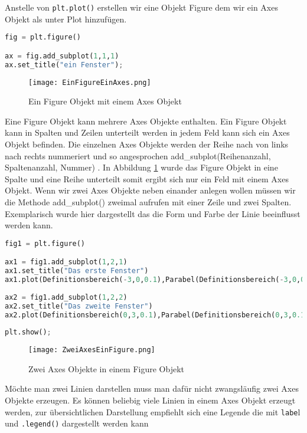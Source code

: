 Anstelle von \texttt{plt.plot()} erstellen wir eine Objekt Figure dem wir ein Axes Objekt als unter Plot hinzufügen.

\begin{lstlisting}[caption= Figure Objekt, label=lst:FigureObjekt,language=Python]
fig = plt.figure()

ax = fig.add_subplot(1,1,1)
ax.set_title("ein Fenster");
\end{lstlisting}

\begin{figure}[!htb]
\centering
\texttt{[image: EinFigureEinAxes.png]}
\caption{Ein Figure Objekt mit einem Axes Objekt}
\label{img:EinFigureEinAxes}
\end{figure}

Eine Figure Objekt kann mehrere Axes Objekte enthalten. Ein Figure Objekt kann in Spalten und Zeilen unterteilt werden in jedem Feld kann sich ein Axes Objekt befinden. Die einzelnen Axes Objekte werden der Reihe nach von links nach rechts nummeriert und so angesprochen add\_subplot(Reihenanzahl, Spaltenanzahl, Nummer) .  In Abbildung \ref{img:EinFigureEinAxes} wurde das Figure Objekt in eine Spalte und eine Reihe unterteilt somit ergibt sich nur ein Feld mit einem Axes Objekt. Wenn wir zwei Axes Objekte neben einander anlegen wollen müssen wir die Methode add\_subplot() zweimal aufrufen mit einer Zeile und zwei Spalten. 
Exemplarisch wurde hier dargestellt das die Form und Farbe der Linie beeinflusst werden kann. 

\begin{lstlisting}[caption=  Zwei Axes Objekte in einem Figure Objekt, label=lst:ZweiAxesEinFigure,language=Python]
fig1 = plt.figure()

ax1 = fig1.add_subplot(1,2,1)
ax1.set_title("Das erste Fenster")
ax1.plot(Definitionsbereich(-3,0,0.1),Parabel(Definitionsbereich(-3,0,0.1)),'g:')
    
ax2 = fig1.add_subplot(1,2,2)
ax2.set_title("Das zweite Fenster")
ax2.plot(Definitionsbereich(0,3,0.1),Parabel(Definitionsbereich(0,3,0.1)),'r--')
    
plt.show();
\end{lstlisting}

\begin{figure}[!htb]
\centering
\texttt{[image: ZweiAxesEinFigure.png]}
\caption{Zwei Axes Objekte in einem Figure Objekt}
\label{img:ZweiAxesEinFigure}
\end{figure}

Möchte man zwei Linien darstellen muss man dafür nicht zwangsläufig zwei Axes Objekte erzeugen. Es können beliebig viele Linien in einem Axes Objekt erzeugt werden, zur übersichtlichen Darstellung empfiehlt sich eine Legende die mit \texttt{labe}l und \texttt{.legend()} dargestellt werden kann

